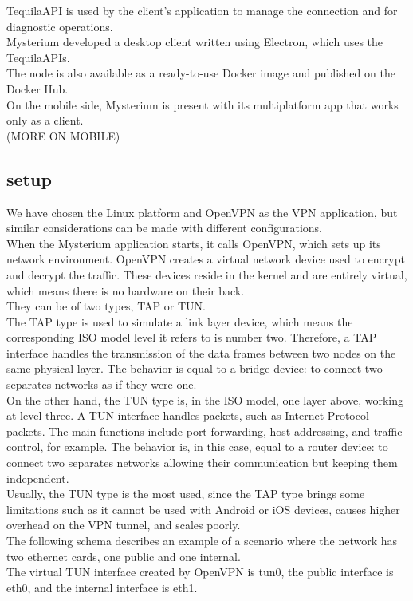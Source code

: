 \documentclass[]{article}
\begin{document}
	TequilaAPI is used by the client's application to manage the connection and for diagnostic operations.\\
	Mysterium developed a desktop client written using Electron, which uses the TequilaAPIs.\\
	The node is also available as a ready-to-use Docker image and published on the Docker Hub.\\
	On the mobile side, Mysterium is present with its multiplatform app that works only as a client.\\
	(MORE ON MOBILE)

	\subsection{setup}

	We have chosen the Linux platform and OpenVPN as the VPN application, but similar considerations can be made with different configurations.\\

	When the Mysterium application starts, it calls OpenVPN, which sets up its network environment. OpenVPN creates a virtual network device used to encrypt and decrypt the traffic. These devices reside in the kernel and are entirely virtual, which means there is no hardware on their back.\\
	They can be of two types, TAP or TUN.\\
	The TAP type is used to simulate a link layer device, which means the corresponding ISO model level it refers to is number two. Therefore, a TAP interface handles the transmission of the data frames between two nodes on the same physical layer. The behavior is equal to a bridge device: to connect two separates networks as if they were one.\\
	On the other hand, the TUN type is, in the ISO model, one layer above, working at level three. A TUN interface handles packets, such as Internet Protocol packets. The main functions include port forwarding, host addressing, and traffic control, for example. The behavior is, in this case, equal to a router device: to connect two separates networks allowing their communication but keeping them independent.\\
	Usually, the TUN type is the most used, since the TAP type brings some limitations such as it cannot be used with Android or iOS devices, causes higher overhead on the VPN tunnel, and scales poorly.\\
	The following schema describes an example of a scenario where the network has two ethernet cards, one public and one internal.\\
	The virtual TUN interface created by OpenVPN is tun0, the public interface is eth0, and the internal interface is eth1.\\
\end{document}
